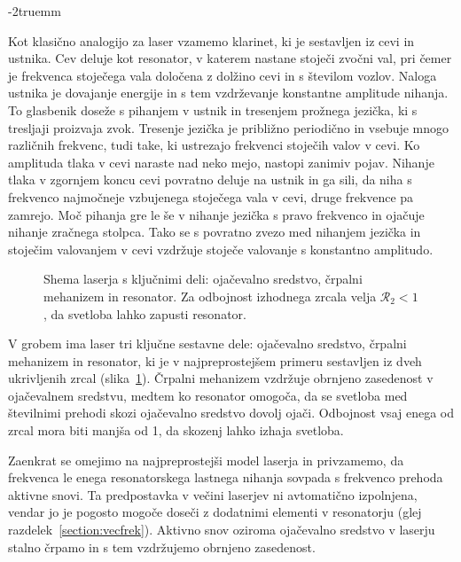 \vglue-2truemm
\begin{remark}
Kot klasično analogijo za laser vzamemo klarinet, ki je sestavljen iz 
cevi in ustnika. Cev deluje kot resonator, v katerem nastane 
stoječi zvočni val, pri čemer je frekvenca stoječega vala določena z 
dolžino cevi in s številom vozlov. Naloga ustnika je dovajanje energije 
in s tem vzdrževanje konstantne amplitude nihanja. To glasbenik doseže s 
pihanjem v ustnik in tresenjem prožnega jezička, ki s tresljaji proizvaja 
zvok. Tresenje jezička je približno periodično in vsebuje mnogo različnih 
frekvenc, tudi take, ki ustrezajo frekvenci stoječih valov v cevi. 
Ko amplituda tlaka v cevi naraste nad neko mejo, nastopi zanimiv
pojav. Nihanje tlaka v zgornjem koncu cevi povratno deluje na ustnik
in ga sili, da niha s frekvenco najmočneje vzbujenega stoječega vala v cevi,
druge frekvence pa zamrejo. Moč pihanja gre le še v
nihanje jezička s pravo frekvenco in ojačuje nihanje zračnega stolpca. 
Tako se s povratno zvezo med nihanjem jezička in stoječim valovanjem v cevi
vzdržuje stoječe valovanje s konstantno amplitudo. 
\end{remark}

\begin{figure}[ht]
\centering
\def\svgwidth{80truemm} 

\caption{Shema laserja s ključnimi deli: 
ojačevalno sredstvo, črpalni mehanizem in resonator.
Za odbojnost izhodnega zrcala velja $\mathcal{R}_2<1$, da svetloba lahko zapusti resonator.}
\label{fig:shemalaserja}
\end{figure}

V grobem ima laser tri ključne sestavne dele: ojačevalno sredstvo, 
črpalni mehanizem in resonator, ki je v najpreprostejšem primeru sestavljen iz dveh 
ukrivljenih zrcal (slika~\ref{fig:shemalaserja}). Črpalni 
mehanizem vzdržuje obrnjeno zasedenost v ojačevalnem sredstvu, medtem ko resonator 
omogoča, da se svetloba med številnimi prehodi skozi ojačevalno sredstvo dovolj ojači.
Odbojnost vsaj enega od zrcal 
mora biti manjša od 1, da skozenj lahko izhaja svetloba.

Zaenkrat se omejimo na najpreprostejši model laserja in 
privzamemo, da frekvenca le enega resonatorskega lastnega nihanja sovpada s 
frekvenco prehoda aktivne snovi. Ta predpostavka v večini laserjev ni
avtomatično izpolnjena, vendar jo je pogosto mogoče doseči z dodatnimi elementi 
v resonatorju (glej razdelek~\ref{section:vecfrek}). 
Aktivno snov oziroma ojačevalno sredstvo v laserju stalno 
črpamo in s tem vzdržujemo obrnjeno zasedenost. 

